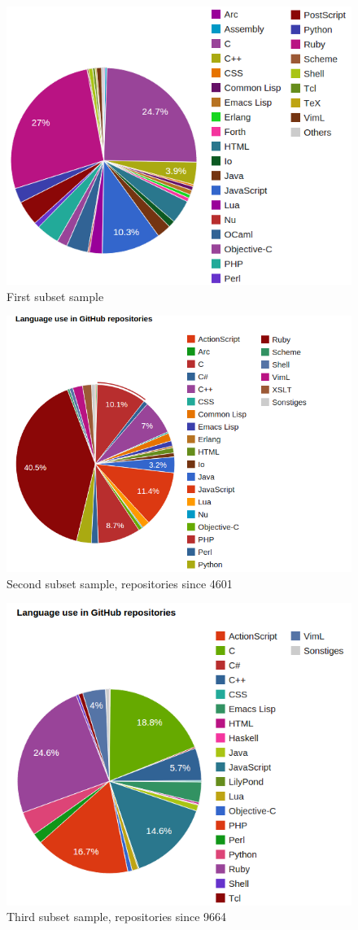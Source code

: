 \begin{figure}[h]
    \centering
    \includegraphics[width=0.8\linewidth]{images/sample1.png}
    \caption{First subset sample}
    \label{fig:sample1}
\end{figure}

\begin{figure}[h]
    \centering
    \includegraphics[width=0.8\linewidth]{images/sample2-since-4601.png}
    \caption{Second subset sample, repositories since 4601}
    \label{fig:sample2}
\end{figure}

\begin{figure}[h]
    \centering
    \includegraphics[width=0.8\linewidth]{images/sample3-since-9664.png}
    \caption{Third subset sample, repositories since 9664}
    \label{fig:sample3}
\end{figure}
